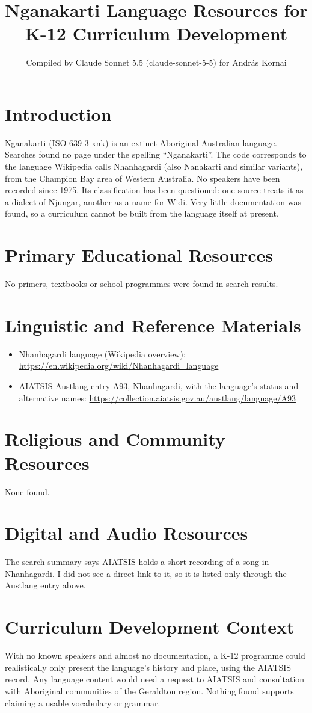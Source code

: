 \documentclass[12pt]{article}
\title{Nganakarti Language Resources for K-12 Curriculum Development}
\author{Compiled by Claude Sonnet 5.5 (claude-sonnet-5-5) for Andr\'as Kornai}
\date{}
\begin{document}
\maketitle

\section{Introduction}
Nganakarti (ISO 639-3 xnk) is an extinct Aboriginal Australian language. Searches found no page under the spelling ``Nganakarti''. The code corresponds to the language Wikipedia calls Nhanhagardi (also Nanakarti and similar variants), from the Champion Bay area of Western Australia. No speakers have been recorded since 1975. Its classification has been questioned: one source treats it as a dialect of Njungar, another as a name for Widi. Very little documentation was found, so a curriculum cannot be built from the language itself at present.

\section{Primary Educational Resources}
No primers, textbooks or school programmes were found in search results.

\section{Linguistic and Reference Materials}
\begin{itemize}
\item Nhanhagardi language (Wikipedia overview): \url{https://en.wikipedia.org/wiki/Nhanhagardi_language}
\item AIATSIS Austlang entry A93, Nhanhagardi, with the language's status and alternative names: \url{https://collection.aiatsis.gov.au/austlang/language/A93}
\end{itemize}

\section{Religious and Community Resources}
None found.

\section{Digital and Audio Resources}
The search summary says AIATSIS holds a short recording of a song in Nhanhagardi. I did not see a direct link to it, so it is listed only through the Austlang entry above.

\section{Curriculum Development Context}
With no known speakers and almost no documentation, a K-12 programme could realistically only present the language's history and place, using the AIATSIS record. Any language content would need a request to AIATSIS and consultation with Aboriginal communities of the Geraldton region. Nothing found supports claiming a usable vocabulary or grammar.
\end{document}
